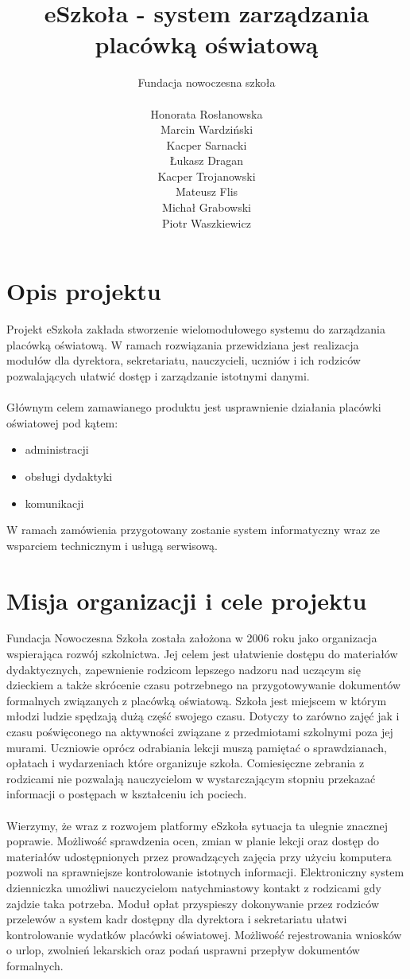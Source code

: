 \documentclass{article}
\author{Fundacja nowoczesna szkoła\\\\
Honorata Rosłanowska \\
Marcin Wardziński\\
Kacper Sarnacki \\
Łukasz Dragan \\
Kacper Trojanowski \\
Mateusz Flis \\
Michał Grabowski \\
Piotr Waszkiewicz}
\title{eSzkoła - system zarządzania placówką oświatową}
\begin{document}
\maketitle
\newpage
\tableofcontents
\newpage

\section{Opis projektu}
Projekt eSzkoła zakłada stworzenie wielomodułowego systemu do zarządzania placówką oświatową. W ramach rozwiązania przewidziana jest realizacja modułów dla dyrektora, sekretariatu, nauczycieli, uczniów i ich rodziców pozwalających ułatwić dostęp i zarządzanie istotnymi danymi. \\ \\
Głównym celem zamawianego produktu jest usprawnienie działania placówki oświatowej pod kątem:
\begin{itemize}
    \item administracji
    \item obsługi dydaktyki
    \item komunikacji
\end{itemize}
W ramach zamówienia przygotowany zostanie system informatyczny wraz ze wsparciem technicznym i usługą serwisową.

\section{Misja organizacji i cele projektu}
Fundacja Nowoczesna Szkoła została założona w 2006 roku jako organizacja wspierająca rozwój szkolnictwa. Jej celem jest ułatwienie dostępu do materiałów dydaktycznych, zapewnienie rodzicom lepszego nadzoru nad uczącym się dzieckiem a także skrócenie czasu potrzebnego na przygotowywanie dokumentów formalnych związanych z placówką oświatową. Szkoła jest miejscem w którym młodzi ludzie spędzają dużą część swojego czasu. Dotyczy to zarówno zajęć jak i czasu poświęconego na aktywności związane z przedmiotami szkolnymi poza jej murami. Uczniowie oprócz odrabiania lekcji muszą pamiętać o sprawdzianach, opłatach i wydarzeniach które organizuje szkoła. Comiesięczne zebrania z rodzicami nie pozwalają nauczycielom w wystarczającym stopniu przekazać informacji o postępach w kształceniu ich pociech. \\ \\
Wierzymy, że wraz z rozwojem platformy eSzkoła sytuacja ta ulegnie znacznej poprawie. Możliwość sprawdzenia ocen, zmian w planie lekcji oraz dostęp do materiałów udostępnionych przez prowadzących zajęcia przy użyciu komputera pozwoli na sprawniejsze kontrolowanie istotnych informacji. Elektroniczny system dzienniczka umożliwi nauczycielom natychmiastowy kontakt z rodzicami gdy zajdzie taka potrzeba. Moduł opłat przyspieszy dokonywanie przez rodziców przelewów a system kadr dostępny dla dyrektora i sekretariatu ułatwi kontrolowanie wydatków placówki oświatowej. Możliwość rejestrowania wniosków o urlop, zwolnień lekarskich oraz podań usprawni przepływ dokumentów formalnych.
\end{document}
